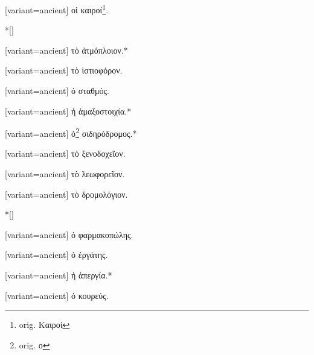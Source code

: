 \switchcolumn*
{}%
\switchcolumn
\begin{greek}[variant=ancient]%
οἰ καιροί\footnote{\textlatin{%
orig. \textgreek{Καιροί}}%
}.%
\end{greek}%
\switchcolumn*
\switchcolumn[0]*[\StarOrnament]%
\switchcolumn
\begin{greek}[variant=ancient]%
τὸ ἀτμόπλοιον.{*}%
\end{greek}%
\switchcolumn*
{}%
\switchcolumn
\begin{greek}[variant=ancient]%
τὸ ἱστιοφόρον.%
\end{greek}%
\switchcolumn*
{}%
\switchcolumn
\begin{greek}[variant=ancient]%
ὁ σταθμός.%
\end{greek}%
\switchcolumn*
{}%
\switchcolumn
\begin{greek}[variant=ancient]%
ἡ ἁμαξοστοιχία.{*}%
\end{greek}%
\switchcolumn*
{}%
\switchcolumn
\begin{greek}[variant=ancient]%
ὁ\footnote{\textlatin{%
orig. \textgreek{ο}}%
} σιδηρόδρομος.{*}%
\end{greek}%
\switchcolumn*
{}%
\switchcolumn
\begin{greek}[variant=ancient]%
τὸ ξενοδοχεῖον.%
\end{greek}%
\switchcolumn*
{}%
\switchcolumn
\begin{greek}[variant=ancient]%
τὸ λεωφορεῖον.%
\end{greek}%
\switchcolumn*
{}%
\switchcolumn
\begin{greek}[variant=ancient]%
τὸ δρομολόγιον.%
\end{greek}%
\switchcolumn*
\switchcolumn[0]*[\StarOrnament]%
\switchcolumn
\begin{greek}[variant=ancient]%
ὁ φαρμακοπώλης.%
\end{greek}%
\switchcolumn*
{}%
\switchcolumn
\begin{greek}[variant=ancient]%
ὁ ἐργάτης.%
\end{greek}%
\switchcolumn*
{}%
\switchcolumn
\begin{greek}[variant=ancient]%
ἡ ἀπεργία.{*}%
\end{greek}%
\switchcolumn*
{}%
\switchcolumn
\begin{greek}[variant=ancient]%
ὁ κουρεύς.%
\end{greek}%
